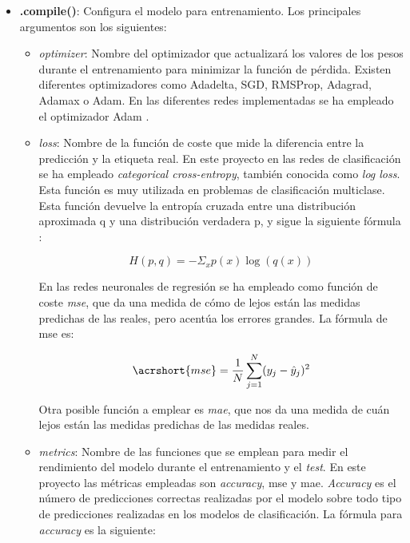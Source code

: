 \begin{itemize}
    \item \textbf{.compile()}: Configura el modelo para entrenamiento. Los principales argumentos son los siguientes:
    
        \begin{itemize}
            \item \textit{optimizer}: Nombre del optimizador que actualizará los valores de los pesos durante el entrenamiento para minimizar la función de pérdida. Existen diferentes optimizadores como Adadelta, SGD, RMSProp, Adagrad, Adamax o Adam. En las diferentes redes implementadas se ha empleado el optimizador Adam \cite{adam}.
            
            \item \textit{loss}: Nombre de la función de coste que mide la diferencia entre la predicción y la etiqueta real. En este proyecto en las redes de clasificación se ha empleado \textit{categorical cross-entropy}, también conocida como \textit{log loss}. Esta función es muy utilizada en problemas de clasificación multiclase. Esta función devuelve la entropía cruzada entre una distribución aproximada q y una distribución verdadera p, y sigue la siguiente fórmula \cite{ops_theano}:
            
            \begin{equation}\label{eq:categorical_crossentropy}
		    H(p,q)=-\Sigma_{x}p(x)\log(q(x))
		    \end{equation}	
            
            En las redes neuronales de regresión se ha empleado como función de coste \textit{\acrfull{mse}}, que da una medida de cómo de lejos están las medidas predichas de las reales, pero acentúa los errores grandes. La fórmula de \acrshort{mse} es:
            
            \begin{equation}\label{eq:mse}
                \acrshort{mse} = \frac{1}{N}\sum_{j=1}^{N}(y_j - \hat{y}_j)^2
            \end{equation}
            
            Otra posible función a emplear es \textit{\acrfull{mae}}, que nos da una medida de cuán lejos están las medidas predichas de las medidas reales.
            
            \item \textit{metrics}: Nombre de las funciones que se emplean para medir el rendimiento del modelo durante el entrenamiento y el \textit{test}. En este proyecto las métricas empleadas son \textit{accuracy}, \acrshort{mse} y \acrshort{mae}. \textit{Accuracy} es el número de predicciones correctas realizadas por el modelo sobre todo tipo de predicciones realizadas en los modelos de clasificación. La fórmula para \textit{accuracy} es la siguiente:
            

\end{itemize}
\end{itemize}
